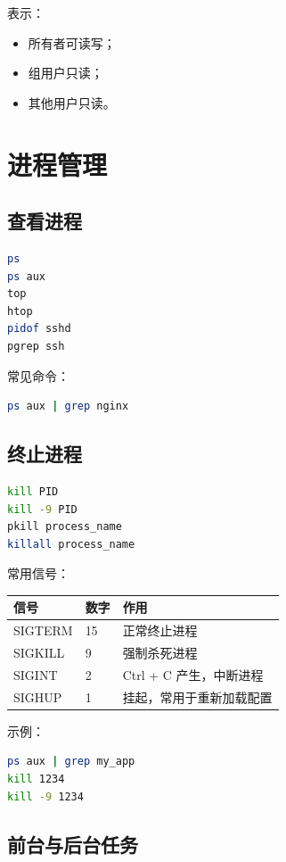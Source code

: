 \documentclass[UTF8,a4paper,12pt]{ctexart}
\begin{document}
表示：
\begin{itemize}
    \item 所有者可读写；
    \item 组用户只读；
    \item 其他用户只读。
\end{itemize}

\section{进程管理}

\subsection{查看进程}

\begin{lstlisting}[language=bash]
ps
ps aux
top
htop
pidof sshd
pgrep ssh
\end{lstlisting}

常见命令：

\begin{lstlisting}[language=bash]
ps aux | grep nginx
\end{lstlisting}

\subsection{终止进程}

\begin{lstlisting}[language=bash]
kill PID
kill -9 PID
pkill process_name
killall process_name
\end{lstlisting}

常用信号：

\begin{longtable}{p{4cm}p{4cm}p{6cm}}
\toprule
信号 & 数字 & 作用 \\
\midrule
SIGTERM & 15 & 正常终止进程 \\
SIGKILL & 9 & 强制杀死进程 \\
SIGINT & 2 & Ctrl + C 产生，中断进程 \\
SIGHUP & 1 & 挂起，常用于重新加载配置 \\
\bottomrule
\end{longtable}

示例：

\begin{lstlisting}[language=bash]
ps aux | grep my_app
kill 1234
kill -9 1234
\end{lstlisting}

\subsection{前台与后台任务}
\end{document}
